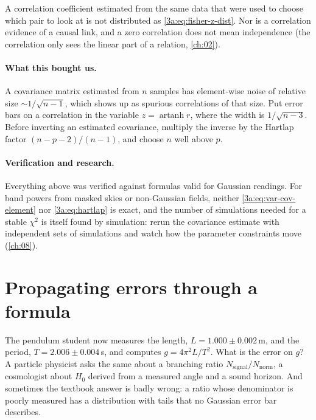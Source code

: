 \begin{pitfall}
A correlation coefficient estimated from the same data that were used to
choose which pair to look at is not distributed as
\eqref{3a:eq:fisher-z-dist}. Nor is a correlation evidence of a causal link,
and a zero correlation does not mean independence (the correlation only
sees the linear part of a relation, \cref{ch:02}).
\end{pitfall}

\paragraph{What this bought us.}
A covariance matrix estimated from $n$ samples has element-wise noise of
relative size $\sim1/\sqrt{n-1}$, which shows up as spurious correlations of
that size. Put error bars on a correlation in the variable
$z=\operatorname{artanh}r$, where the width is $1/\sqrt{n-3}$. Before
inverting an estimated covariance, multiply the inverse by the Hartlap
factor $(n-p-2)/(n-1)$, and choose $n$ well above $p$.

\paragraph{Verification and research.}
Everything above was verified against formulas valid for Gaussian
readings. For band powers from masked skies or non-Gaussian fields, neither
\eqref{3a:eq:var-cov-element} nor \eqref{3a:eq:hartlap} is exact, and the
number of simulations needed for a stable $\chi^2$ is itself found by
simulation: rerun the covariance estimate with independent sets of
simulations and watch how the parameter constraints move (\cref{ch:08}).

\section{Propagating errors through a formula}
\label{3a:sec:propagation}

The pendulum student now measures the length, $L=1.000\pm0.002\,$m, and the
period, $T=2.006\pm0.004\,$s, and computes $g=4\pi^2L/T^2$. What is the error
on $g$? A particle physicist asks the same about a branching ratio
$N_{\text{signal}}/N_{\text{norm}}$, a cosmologist about $H_0$ derived from a
measured angle and a sound horizon. And sometimes the textbook answer is badly
wrong: a ratio whose denominator is poorly measured has a distribution with
tails that no Gaussian error bar describes.

